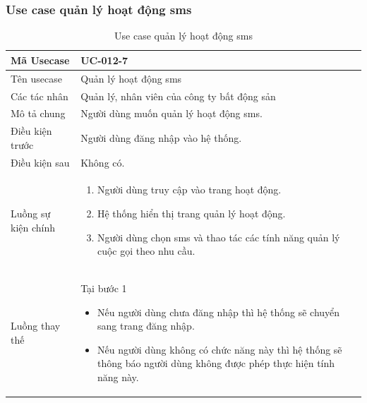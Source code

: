 \documentclass[12pt,a4paper]{article}
\begin{document}
    \subsubsection*{Use case quản lý hoạt động sms}
    \begin{table}[H]
        \centering
        \begin{tabular}{|p{3.5cm}|p{11.5cm}|c|}
            \hline
            Mã Usecase      & UC-012-7                                    \\
            \hline
            Tên usecase     & Quản lý hoạt động sms                       \\
            \hline
            Các tác nhân    & Quản lý, nhân viên của công ty bất động sản \\
            \hline
            Mô tả chung     & Người dùng muốn quản lý hoạt động sms.      \\
            \hline

            Điều kiện trước & Người dùng đăng nhập vào hệ thống.          \\
            \hline

            Điều kiện sau   & Không có.                                   \\
            \hline

            Luồng sự kiện chính & \vspace{-.8cm}\begin{enumerate}
                                                    \item Người dùng truy cập vào trang hoạt động.
                                                    \item Hệ thống hiển thị trang quản lý hoạt động.
                                                    \item Người dùng chọn sms và thao tác các tính năng quản lý cuộc gọi theo nhu cầu.
            \end{enumerate}
            \\
            \hline
            Luồng thay thế & Tại bước 1\newline
            \vspace{-.8cm}\begin{itemize}
                              \item Nếu người dùng chưa đăng nhập thì hệ thống sẽ chuyển sang trang đăng nhập.
                              \item Nếu người dùng không có chức năng này thì hệ thống sẽ thông báo người dùng không được phép thực hiện tính năng này.
            \end{itemize}

            \\ \hline
        \end{tabular}
        \caption{Use case quản lý hoạt động sms}

    \end{table}
\end{document}
